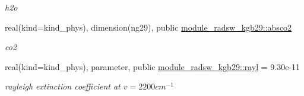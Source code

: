 \begin{DoxyCompactItemize}
\begin{DoxyCompactList}\small\item\em h2o \end{DoxyCompactList}\item 
\mbox{\label{group__module__radsw__kgbnn_gaa9a57e32dfbb8979478aa8c931ff0e2d}} 
real(kind=kind\+\_\+phys), dimension(ng29), public \hyperlink{group__module__radsw__kgbnn_gaa9a57e32dfbb8979478aa8c931ff0e2d}{module\+\_\+radsw\+\_\+kgb29\+::absco2}
\begin{DoxyCompactList}\small\item\em co2 \end{DoxyCompactList}\item 
\mbox{\label{group__module__radsw__kgbnn_gabc0a41a10d73674e124115fe0511cc23}} 
real(kind=kind\+\_\+phys), parameter, public \hyperlink{group__module__radsw__kgbnn_gabc0a41a10d73674e124115fe0511cc23}{module\+\_\+radsw\+\_\+kgb29\+::rayl} = 9.\+30e-\/11
\begin{DoxyCompactList}\small\item\em rayleigh extinction coefficient at $v=2200cm^{-1}$ \end{DoxyCompactList}\end{DoxyCompactItemize}
